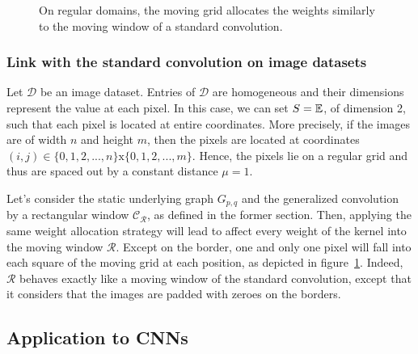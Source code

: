 \begin{figure}[h]
\begin{floatrow}
{
    }
    {
      \caption{On regular domains, the moving grid allocates the weights similarly to the moving window of a standard convolution.}
      \label{regDomain}
    }
  \end{floatrow}
\end{figure}

  \subsubsection{Link with the standard convolution on image datasets}
  \label{link}

  Let $\mathcal{D}$ be an image dataset. Entries of $\mathcal{D}$ are homogeneous and their dimensions represent the value at each pixel. In this case, we can set $S=\mathbb{E}$, of dimension 2, such that each pixel is located at entire coordinates. More precisely, if the images are of width $n$ and height $m$, then the pixels are located at coordinates $(i,j) \in \{0, 1, 2, ..., n\} \text{x} \{0, 1, 2, ..., m\}$. Hence, the pixels lie on a regular grid and thus are spaced out by a constant distance $\mu = 1$.

  Let's consider the static underlying graph $G_{p,q}$ and the generalized convolution by a rectangular window $\mathcal{C_\mathcal{R}}$, as defined in the former section. Then, applying the same weight allocation strategy will lead to affect every weight of the kernel into the moving window $\mathcal{R}$. Except on the border, one and only one pixel will fall into each square of the moving grid at each position, as depicted in figure~\ref{regDomain}. Indeed, $\mathcal{R}$ behaves exactly like a moving window of the standard convolution, except that it considers that the images are padded with zeroes on the borders.

  \subsection{Application to CNNs}
\label{cnn}


